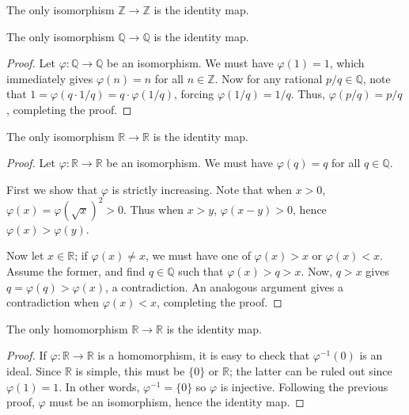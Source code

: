 \documentclass[11pt]{article}
\newcommand{\R}{\mathbb{R}}
\newcommand{\Q}{\mathbb{Q}}
\newcommand{\Z}{\mathbb{Z}}
\theoremstyle{definition}
\theoremstyle{remark}
\numberwithin{equation}{section}
\begin{document}
    \begin{lemma}
        The only isomorphism $\Z \to \Z$ is the identity map.
    \end{lemma}
    \begin{theorem}
        The only isomorphism $\Q \to \Q$ is the identity map.
    \end{theorem}
    \begin{proof}
        Let $\varphi\colon \Q \to \Q$ be an isomorphism. We must have $\varphi(1) =
        1$, which immediately gives $\varphi(n) = n$ for all $n \in \Z$. Now for any
        rational $p / q \in \Q$, note that $1 = \varphi(q \cdot 1 / q) = q \cdot
        \varphi(1 / q)$, forcing $\varphi(1 / q) = 1 / q$. Thus, $\varphi(p / q) = p
        / q$, completing the proof.
    \end{proof}
    
    \begin{theorem}
        The only isomorphism $\R \to \R$ is the identity map.
    \end{theorem}
    \begin{proof}
        Let $\varphi\colon \R \to \R$ be an isomorphism. We must have $\varphi(q)
        = q$ for all $q \in \Q$.

        First we show that $\varphi$ is strictly increasing. Note that when $x > 0$,
        $\varphi(x) = \varphi(\sqrt{x})^2 > 0$. Thus when $x > y$, $\varphi(x - y) >
        0$, hence $\varphi(x) > \varphi(y)$.

        Now let $x \in \R$; if $\varphi(x) \neq x$, we must have one of $\varphi(x) >
        x$ or $\varphi(x) < x$. Assume the former, and find $q \in \Q$ such that
        $\varphi(x) > q > x$. Now, $q > x$ gives $q = \varphi(q) > \varphi(x)$, a
        contradiction.  An analogous argument gives a contradiction when $\varphi(x)
        < x$, completing the proof.
    \end{proof}
    
    \begin{theorem}
        The only homomorphism $\R \to \R$ is the identity map.
    \end{theorem}
    \begin{proof}
        If $\varphi\colon \R \to \R$ is a homomorphism, it is easy to check that
        $\varphi^{-1}(0)$ is an ideal. Since $\R$ is simple, this must be $\{0\}$ or
        $\R$; the latter can be ruled out since $\varphi(1) = 1$. In other words,
        $\varphi^{-1} = \{0\}$ so $\varphi$ is injective. Following the previous
        proof, $\varphi$ must be an isomorphism, hence the identity map.
    \end{proof}
\end{document}
